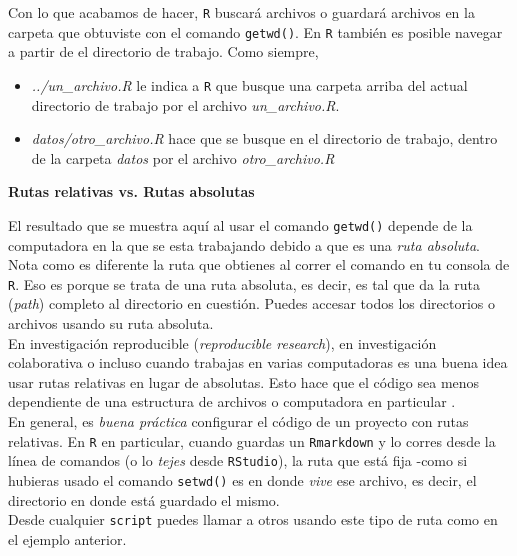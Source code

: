 \documentclass[]{article}
\providecommand{\tightlist}{%
  \setlength{\itemsep}{0pt}\setlength{\parskip}{0pt}}
\begin{document}
Con lo que acabamos de hacer, \texttt{R} buscará archivos o guardará
archivos en la carpeta que obtuviste con el comando \texttt{getwd()}. En
\texttt{R} también es posible navegar a partir de el directorio de
trabajo. Como siempre,

\begin{itemize}
\tightlist
\item
  \emph{../un\_archivo.R} le indica a \texttt{R} que busque una carpeta
  arriba del actual directorio de trabajo por el archivo
  \emph{un\_archivo.R}.
\item
  \emph{datos/otro\_archivo.R} hace que se busque en el directorio de
  trabajo, dentro de la carpeta \emph{datos} por el archivo
  \emph{otro\_archivo.R}
\end{itemize}

\begin{nota}
\textbf{Rutas relativas vs. Rutas absolutas\\}

El resultado que se muestra aquí al usar el comando \texttt{getwd()} depende de la computadora en la que se esta 
trabajando debido a que es una \textit{ruta absoluta}. Nota como es diferente la ruta 
que obtienes al correr el comando en tu consola de \texttt{R}. Eso es porque se trata 
de una ruta absoluta, es decir, es tal que da la ruta (\textit{path}) completo
al directorio en cuestión. Puedes accesar todos los directorios o archivos usando su ruta absoluta.\\

En investigación reproducible (\textit{reproducible research}), en investigación colaborativa o
incluso cuando trabajas en varias computadoras es una buena idea usar rutas relativas
en lugar de absolutas. Esto hace que el código sea menos dependiente de una estructura
de archivos o computadora en particular \parencite[][p. 67]{gandrud2013}. \\

En general, es \textit{buena práctica} configurar el código de un proyecto con rutas relativas.
En \texttt{R} en particular, cuando guardas un \texttt{Rmarkdown} y lo corres desde la línea de
comandos (o lo \textit{tejes} desde \texttt{RStudio}), la ruta que está fija -como si hubieras usado el comando \texttt{setwd()} es
en donde \textit{vive} ese archivo, es decir, el directorio en donde está guardado el mismo.\\

Desde cualquier \texttt{script} puedes llamar a otros usando este tipo de ruta como en 
el ejemplo anterior.
\end{nota}
\end{document}
